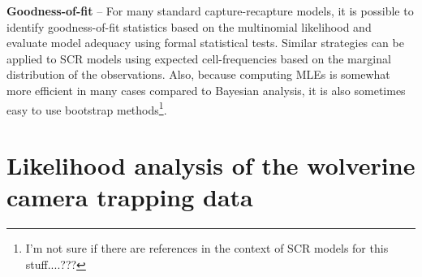 {\bf Goodness-of-fit} -- For many standard capture-recapture models,
it is possible to identify goodness-of-fit statistics based on the
multinomial likelihood and evaluate model adequacy using formal
statistical tests. Similar strategies can be applied to SCR models
using expected cell-frequencies based on the marginal distribution of
the observations. Also, because computing MLEs is somewhat more
efficient in many cases compared to Bayesian analysis, it is also
sometimes easy to use bootstrap methods\footnote{I'm not sure if there
  are references in the context of SCR models for this stuff....???}.



\section{Likelihood analysis of the wolverine camera trapping data}
\label{mle.sec.wolverine}


